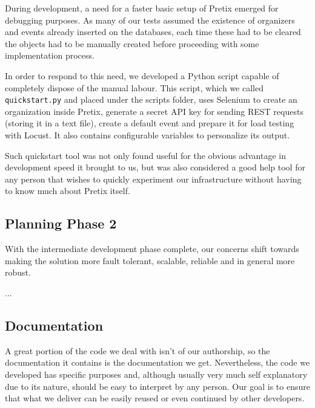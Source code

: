 \documentclass[12pt]{article}
\begin{document}

During development, a need for a faster basic setup of Pretix emerged for debugging purposes.
As many of our tests assumed the existence of organizers and events already inserted on the databases, each time these had to be cleared the objects had to be 
manually created before proceeding with some implementation process.

In order to respond to this need, we developed a Python script capable of completely dispose of the manual labour.
This script, which we called \texttt{quickstart.py} and placed under the scripts folder, uses Selenium \cite{selenium} to create an organization inside Pretix, 
generate a secret API key for sending REST requests (storing it in a text file), create a default event and prepare it for load testing with Locust.
It also contains configurable variables to personalize its output.

Such quickstart tool was not only found useful for the obvious advantage in development speed it brought to us, but was also considered a good help tool for any 
person that wishes to quickly experiment our infrastructure without having to know much about Pretix itself.

\subsection{Planning Phase 2} \label{remarks.planning} %


With the intermediate development phase complete, our concerns shift towards making the solution more fault tolerant, scalable, reliable and in general more robust.

...

\subsection{Documentation} \label{remarks.documentation} %


A great portion of the code we deal with isn't of our authorship, so the documentation it contains is the documentation we get.
Nevertheless, the code we developed has specific purposes and, although usually very much self explanatory due to its nature, should be easy to interpret by any person.
Our goal is to ensure that what we deliver can be easily reused or even continued by other developers.
\end{document}
